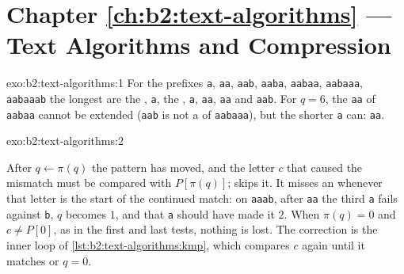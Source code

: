 \section*{Chapter \ref{ch:b2:text-algorithms} --- Text Algorithms and Compression}

\begin{solution}{exo:b2:text-algorithms:1}
For the prefixes \texttt{a}, \texttt{aa}, \texttt{aab}, \texttt{aaba}, \texttt{aabaa}, \texttt{aabaaa}, \texttt{aabaaab}
the longest  are the , \texttt{a}, the , \texttt{a}, \texttt{aa}, \texttt{aa} and
\texttt{aab}. For $q = 6$, the  \texttt{aa} of \texttt{aabaa} cannot be extended (\texttt{aab} is not a  of
\texttt{aabaaa}), but the shorter  \texttt{a} can: \texttt{aa}.

\end{solution}

\begin{solution}{exo:b2:text-algorithms:2}

After $q \gets \pi(q)$ the pattern has moved, and the letter $c$ that caused the mismatch must be compared with
$P[\pi(q)]$;  skips it. It misses an  whenever that letter is the start of the continued match:
on \texttt{aaab}, after \texttt{aa} the third \texttt{a} fails against \texttt{b}, $q$ becomes $1$, and that \texttt{a}
should have made it $2$. When $\pi(q) = 0$ and $c \neq P[0]$, as in the first and last tests, nothing is lost. The
correction is the inner  loop of \cref{lst:b2:text-algorithms:kmp}, which compares $c$ again until it
matches or $q = 0$.
\end{solution}


